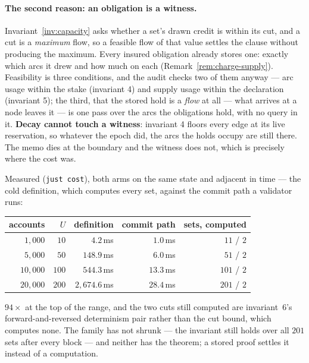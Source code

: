 \paragraph{The second reason: an obligation is a witness.} Invariant~\ref{inv:capacity}
asks whether a set's drawn credit is within its cut, and a cut is a \emph{maximum} flow,
so a feasible flow of that value settles the clause without producing the maximum. Every
insured obligation already stores one: exactly which arcs it drew and how much on each
(Remark~\ref{rem:charge-supply}). Feasibility is three conditions, and the audit checks
two of them anyway --- arc usage within the stake (invariant 4) and supply usage within
the declaration (invariant 5); the third, that the stored hold is a \emph{flow} at all ---
what arrives at a node leaves it --- is one pass over the arcs the obligations hold, with
no query in it. \textbf{Decay cannot touch a witness}: invariant 4 floors every edge at its
live reservation, so whatever the epoch did, the arcs the holds occupy are still there.
The memo dies at the boundary and the witness does not, which is precisely where the cost
was.

Measured (\texttt{just cost}), both arms on the same state and adjacent in time --- the
cold definition, which computes every set, against the commit path a validator runs:

\begin{center}
\begin{tabular}{rrrrr}
\toprule
accounts & $U$ & definition & commit path & sets, computed \\
\midrule
$1{,}000$  & $10$  & $4.2$\,ms   & $1.0$\,ms   & $11$ / $2$ \\
$5{,}000$  & $50$  & $148.9$\,ms  & $6.0$\,ms  & $51$ / $2$ \\
$10{,}000$ & $100$ & $544.3$\,ms & $13.3$\,ms & $101$ / $2$ \\
$20{,}000$ & $200$ & $2{,}674.6$\,ms & $28.4$\,ms & $201$ / $2$ \\
\bottomrule
\end{tabular}
\end{center}

$94\times$ at the top of the range, and the two cuts still computed are
invariant~6's forward-and-reversed determinism pair rather than the cut bound, which
computes none. The family has not shrunk --- the invariant still holds over all $201$ sets
after every block --- and neither has the theorem; a stored proof settles it instead of a
computation.

